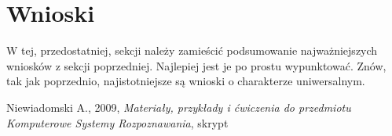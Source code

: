 \documentclass[a4paper]{classrep}
\begin{document}
\section{Wnioski}
{\color{blue}W tej, przedostatniej, sekcji należy zamieścić podsumowanie
najważniejszych wniosków z sekcji poprzedniej. Najlepiej jest je po prostu
wypunktować. Znów, tak jak poprzednio, najistotniejsze są wnioski o
charakterze uniwersalnym.}


\begin{thebibliography}{2}
 Niewiadomski A., 2009, \textit{Materiały, przykłady i ćwiczenia do przedmiotu Komputerowe Systemy Rozpoznawania}, skrypt
\end{thebibliography}
\end{document}
